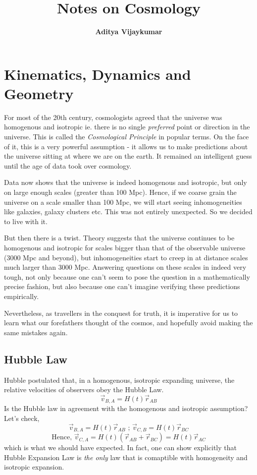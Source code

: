 \documentclass[a4paper,11pt]{report}
\title{\textbf{Notes on Cosmology}}
\author{\textbf{Aditya Vijaykumar}}
\begin{document}
\maketitle \tableofcontents


\chapter{Kinematics, Dynamics and Geometry}
For most of the 20th century, cosmologists agreed that the universe was homogenous and isotropic ie. there is no single \textit{preferred}  point or direction in the universe. This is called the \textit{Cosmological Principle} in popular terms. On the face of it, this is a very powerful assumption - it allows us to make predictions about the universe sitting at where we are on the earth. It remained an intelligent guess until the age of data took over cosmology.

Data now shows that the universe is indeed homogenous and isotropic, but only on large enough scales (greater than 100 Mpc). Hence, if we coarse grain the universe on a scale smaller than 100 Mpc, we will start seeing inhomogeneities like galaxies, galaxy clusters etc. This was not entirely unexpected. So we decided to live with it.

But then there is a twist. Theory suggests that the universe continues to be homogenous and isotropic for scales bigger than that of the observable universe (3000 Mpc and beyond), but inhomogeneities start to creep in at distance scales much larger than 3000 Mpc. Answering questions on these scales in indeed very tough, not only because one can't seem to pose the question in a mathematically precise fashion, but also because one can't imagine verifying these predictions empirically.

Nevertheless, as travellers in the conquest for truth, it is imperative for us to learn what our forefathers thought of the cosmos, and hopefully avoid making the same mistakes again.

\section{Hubble Law}

Hubble postulated that, in a homogenous, isotropic expanding universe, the relative velocities of observers obey the Hubble Law.$$\vec{v}_{B,A}=H(t)\vec{r}_{AB}$$ Is the Hubble law in agreement with the homogenous and isotropic assumption? Let's check,
$$\vec{v}_{B,A}=H(t)\vec{r}_{AB} \text{ ; } \vec{v}_{C,B}=H(t)\vec{r}_{BC}$$
$$\text{Hence, } \vec{v}_{C,A} = H(t)(\vec{r}_{AB} + \vec{r}_{BC}) = H(t)\vec{r}_{AC}$$ which is what we should have expected. In fact, one can show explicitly that Hubble Expansion Law is \textit{the only} law that is comaptible with homogeneity and isotropic expansion.
\end{document}
